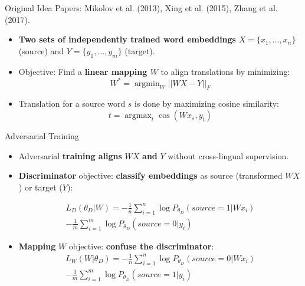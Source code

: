 \documentclass[final]{beamer}
\newlength{\onecolwid}
\DeclareMathOperator*{\argmax}{argmax}
\DeclareMathOperator*{\argmin}{argmin}
\begin{document}
\begin{frame}[t]
\begin{columns}[t]
\begin{column}{\onecolwid}
\begin{block}{Original Idea}
    Papers: Mikolov et al. (2013), Xing et al. (2015), Zhang et al. (2017).
    \begin{itemize}
        \item \textbf{Two sets of independently trained word embeddings} \( X = \{x_1, \dots, x_n\} \) (source) and \( Y = \{y_1, \dots, y_m\}\) (target).
        \item Objective: Find a \textbf{linear mapping \(W\)} to align translations by minimizing: 
        \[
            W^* = \argmin_{W} || W X - Y ||_F
        \]
        \item Translation for a source word \(s\) is done by maximizing cosine similarity:
        \[
            t = \argmax_{t} \cos(W x_s, y_t)
        \]
    \end{itemize}
\end{block}

\begin{block}{Adversarial Training}
   \begin{itemize}
        \item Adversarial \textbf{training aligns} \( WX \) \textbf{and} \( Y \) without cross-lingual supervision.
        \item \textbf{Discriminator} objective: \textbf{classify embeddings} as source (transformed \( WX \)) or target (\( Y \)):
        
       \begin{equation*}
\begin{split}
    L_D(\theta_D | W) = - \frac{1}{n} \sum_{i=1}^n \log P_{\theta_D}(source = 1 | W x_i) \\
    - \frac{1}{m} \sum_{i=1}^m \log P_{\theta_D}(source = 0 | y_i)
\end{split}
\end{equation*}
	
        \item \textbf{Mapping} \( W \) objective: \textbf{confuse the discriminator}:
\begin{equation*}
\begin{split}
    L_W(W | \theta_D) = - \frac{1}{n} \sum_{i=1}^n \log P_{\theta_D}(source = 0 | W x_i) \\
    - \frac{1}{m} \sum_{i=1}^m \log P_{\theta_D}(source = 1 | y_i)
\end{split}
\end{equation*}
    \end{itemize}
\end{block}




\end{column}
\end{columns}
\end{frame}
\end{document}
